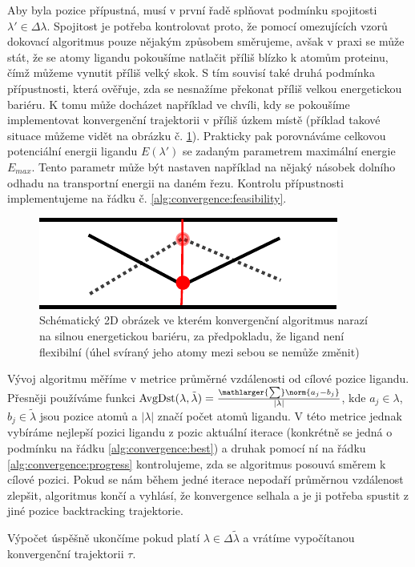 Aby byla pozice přípustná,
musí v první řadě splňovat podmínku spojitosti $ \lambda' \in \Delta\lambda $.
Spojitost je potřeba kontrolovat proto, že pomocí omezujících vzorů dokovací algoritmus
pouze nějakým způsobem směrujeme, avšak v praxi se může stát, že se atomy ligandu
pokoušíme natlačit příliš blízko k atomům proteinu, čímž můžeme vynutit příliš
velký skok. S tím souvisí také druhá podmínka přípustnosti, která ověřuje, zda
se nesnažíme překonat příliš velkou energetickou bariéru. K tomu může docházet
například ve chvíli, kdy se pokoušíme implementovat konvergenční trajektorii
v příliš úzkem místě (příklad takové situace můžeme vidět na obrázku č.
\ref{fig:narrow_tunnel}). Prakticky pak porovnáváme celkovou potenciální energii
ligandu $ E(\lambda') $ se zadaným parametrem maximální energie $ E_{max} $.
Tento parametr může být nastaven například na nějaký násobek dolního odhadu na
transportní energii na daném řezu. Kontrolu přípustnosti implementujeme na řádku
č. \ref{alg:convergence:feasibility}.

\begin{figure}[ht]
\centering
\includegraphics[width=.5\hsize]{img/narrow_tunnel.pdf}
\caption{Schématický 2D obrázek ve kterém konvergenční algoritmus narazí na
silnou energetickou bariéru, za předpokladu, že ligand není flexibilní (úhel
svíraný jeho atomy mezi sebou se nemůže změnit)}
\label{fig:narrow_tunnel}
\end{figure}

Vývoj algoritmu měříme v metrice průměrné vzdálenosti od cílové pozice
ligandu. Přesněji používáme funkci
$ \operatorname{AvgDst}(\lambda, \tilde{\lambda})
    = \frac{\mathlarger{\sum}\norm{a_j - b_j}}{|\lambda|} $, kde $ a_j \in \lambda $,
$ b_j \in \tilde{\lambda} $ jsou pozice atomů a $ |\lambda| $ značí počet atomů ligandu.
V této metrice jednak vybíráme nejlepší pozici ligandu z pozic aktuální iterace
(konkrétně se jedná o podmínku na řádku \ref{alg:convergence:best}) a druhak
pomocí ní na řádku \ref{alg:convergence:progress} kontrolujeme, zda se algoritmus
posouvá směrem k cílové pozici. Pokud se nám během jedné iterace nepodaří průměrnou
vzdálenost zlepšit, algoritmus končí a vyhlásí, že konvergence selhala a je ji
potřeba spustit z jiné pozice backtracking trajektorie.

Výpočet úspěšně ukončíme pokud platí $\lambda \in \Delta\tilde{\lambda}$ a
vrátíme vypočítanou konvergenční trajektorii $ \tau $.

